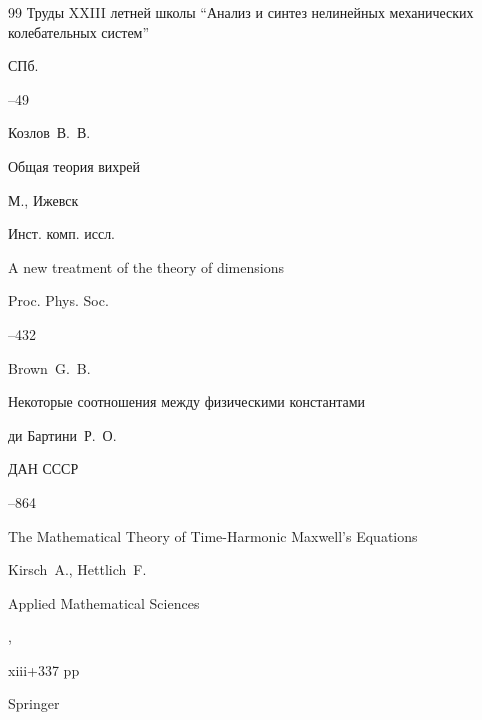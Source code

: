 \begin{thebibliography}{99}
\inbook Труды XXIII летней школы ``Анализ и синтез нелинейных механических колебательных систем''

\publaddr СПб.


–49




\by Козлов~В.~В.

\book Общая теория вихрей

\publaddr М., Ижевск

\publ Инст. комп. иссл.






\paper A new treatment of the theory of dimensions 

\jour Proc. Phys. Soc.





--432

\by Brown~G.~B.




\paper Некоторые соотношения между физическими константами

\by ди Бартини~Р.~О.

\jour ДАН СССР




--864






\book The Mathematical Theory of Time-Harmonic Maxwell's Equations

\by Kirsch~A., Hettlich~F.

\serial Applied Mathematical Sciences



,


xiii+337 pp

\publ Springer 


\end{thebibliography}
